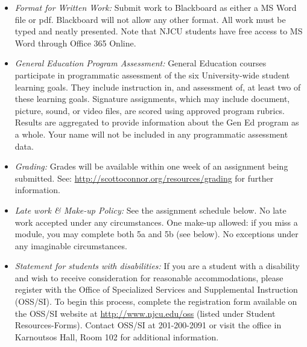 \documentclass[article,oneside]{memoir}
\begin{document}
\begin{itemize}
\item \textit{Format for Written Work:} Submit work to Blackboard as either a MS Word file or pdf. Blackboard will not allow any other format. All work must be typed and neatly presented. Note that NJCU students have free access to MS Word through Office 365 Online.


\item \textit{General Education Program Assessment:} General Education courses participate in programmatic assessment of the six University-wide student learning goals. They include instruction in, and assessment of, at least two of these learning goals. Signature assignments, which may include document, picture, sound, or video files, are scored using approved program rubrics. Results are aggregated to provide information about the Gen Ed program as a whole. Your name will not be included in any programmatic assessment data.

\item \textit{Grading:} Grades will be available within one week of an assignment being submitted. See: \href{http://scottoconnor.org/resources/grading}{http://scottoconnor.org/resources/grading} for further information.


\item \textit{Late work \& Make-up Policy:} See the assignment schedule below. No late work accepted under any circumstances. One make-up allowed: if you miss a module, you may complete both 5a and 5b (see below). No exceptions under any imaginable circumstances.

\item \textit{Statement for students with disabilities:} If you are a student with a disability and wish to receive consideration for reasonable accommodations, please register with the Office of Specialized Services and Supplemental Instruction (OSS/SI). To begin this process, complete the registration form available on the OSS/SI website at \href{http://www.njcu.edu/oss}{http://www.njcu.edu/oss} (listed under Student Resources-Forms). Contact OSS/SI at 201-200-2091 or visit the office in Karnoutsos Hall, Room 102 for additional information.



\end{itemize}
\end{document}
